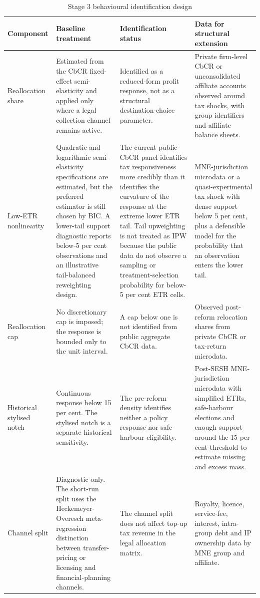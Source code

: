 \begin{table}[H]
\centering
\footnotesize
\setlength{\tabcolsep}{3pt}
\caption{Stage 3 behavioural identification design}
\label{tab:app_stage3_behavioural_design}
\begin{adjustbox}{max width=\textwidth,center}
\begin{tabular}{@{}L{2.7cm}L{4.1cm}L{3.7cm}L{5.1cm}@{}}
\toprule
Component & Baseline treatment & Identification status & Data for structural extension \\
\midrule
Reallocation share & Estimated from the CbCR fixed-effect semi-elasticity and applied only where a legal collection channel remains active. & Identified as a reduced-form profit response, not as a structural destination-choice parameter. & Private firm-level CbCR or unconsolidated affiliate accounts observed around tax shocks, with group identifiers and affiliate balance sheets. \\
Low-ETR nonlinearity & Quadratic and logarithmic semi-elasticity specifications are estimated, but the preferred estimator is still chosen by BIC. A lower-tail support diagnostic reports below-5 per cent observations and an illustrative tail-balanced reweighting design. & The current public CbCR panel identifies tax responsiveness more credibly than it identifies the curvature of the response at the extreme lower ETR tail. Tail upweighting is not treated as IPW because the public data do not observe a sampling or treatment-selection probability for below-5 per cent ETR cells. & MNE-jurisdiction microdata or a quasi-experimental tax shock with dense support below 5 per cent, plus a defensible model for the probability that an observation enters the lower tail. \\
Reallocation cap & No discretionary cap is imposed; the response is bounded only to the unit interval. & A cap below one is not identified from public aggregate CbCR data. & Observed post-reform relocation shares from private CbCR or tax-return microdata. \\
Historical stylised notch & Continuous response below 15 per cent. The stylised notch is a separate historical sensitivity. & The pre-reform density identifies neither a policy response nor safe-harbour eligibility. & Post-SESH MNE-jurisdiction microdata with simplified ETRs, safe-harbour elections and enough support around the 15 per cent threshold to estimate missing and excess mass. \\
Channel split & Diagnostic only. The short-run split uses the Heckemeyer-Overesch meta-regression distinction between transfer-pricing or licensing and financial-planning channels. & The channel split does not affect top-up tax revenue in the legal allocation matrix. & Royalty, licence, service-fee, interest, intra-group debt and IP ownership data by MNE group and affiliate. \\

\end{tabular}
\end{adjustbox}
\end{table}
